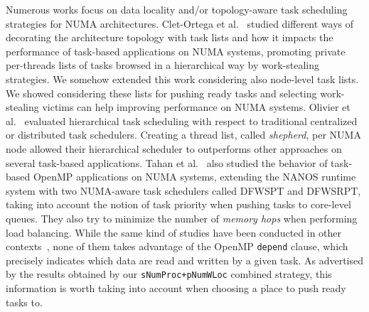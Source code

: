 \documentclass{Styles/llncs}
\begin{document}
Numerous works focus on data locality and/or topology-aware task scheduling strategies for
NUMA architectures.
Clet-Ortega et al.~\cite{DBLP:conf/europar/Clet-OrtegaCP14} studied different ways of decorating the architecture topology with task lists and how it impacts the performance of task-based applications on NUMA systems, promoting private per-threads lists of tasks browsed in a hierarchical way by work-stealing strategies.
We somehow extended this work considering also node-level task lists. We showed considering these lists for pushing ready tasks and selecting work-stealing victims can help improving performance on NUMA systems.
Olivier et al.~\cite{DBLP:journals/ijhpca/OlivierPWSP12} evaluated hierarchical task scheduling with respect to traditional centralized or distributed task schedulers. Creating a thread list, called \emph{shepherd}, per NUMA node allowed their hierarchical scheduler to outperforms other approaches on several task-based applications.
Tahan et al.~\cite{DBLP:journals/corr/Tahan14} also studied the behavior of task-based OpenMP applications on NUMA systems, extending the NANOS runtime system with two NUMA-aware task schedulers called DFWSPT and DFWSRPT, taking into account the notion of task priority when pushing tasks to core-level queues. They also try to minimize the number of \emph{memory hops} when performing load balancing.
While the same kind of studies have been conducted in other contexts~\cite{DBLP:conf/europar/TerbovenSCM12,DBLP:journals/corr/abs-1101-0093}, none of them takes advantage of the OpenMP \verb/depend/ clause, which precisely indicates which data are read and written by a given task. As advertised by the results obtained by our \verb!sNumProc+pNumWLoc! combined strategy, this information is worth taking into account when choosing a place to push ready tasks to.


\end{document}
